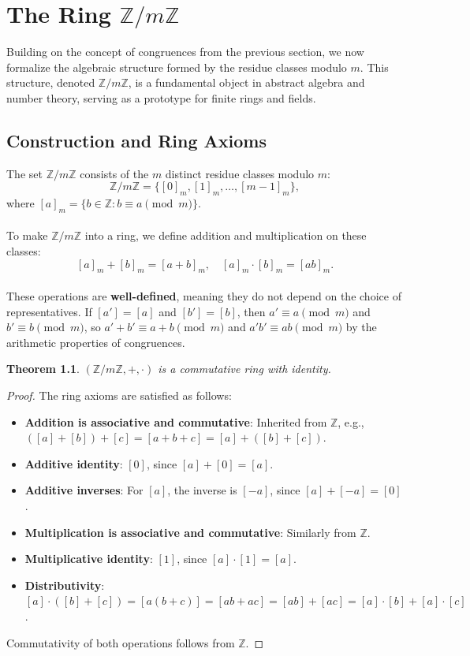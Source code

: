 \documentclass[12pt,openany]{book}
\theoremstyle{definition}
\theoremstyle{plain}
\newtheorem{theorem}{Theorem}[chapter]
\theoremstyle{remark}
\begin{document}
\chapter{The Ring $\mathbb{Z}/m\mathbb{Z}$}

Building on the concept of congruences from the previous section, we now formalize the algebraic structure formed by the residue classes modulo $m$. This structure, denoted $\mathbb{Z}/m\mathbb{Z}$, is a fundamental object in abstract algebra and number theory, serving as a prototype for finite rings and fields.

\section{Construction and Ring Axioms}

The set $\mathbb{Z}/m\mathbb{Z}$ consists of the $m$ distinct residue classes modulo $m$:
\[
\mathbb{Z}/m\mathbb{Z} = \{ [0]_m, [1]_m, \dots, [m-1]_m \},
\]
where $[a]_m = \{ b \in \mathbb{Z} : b \equiv a \pmod{m} \}$.
\noindent
\\ \\
To make $\mathbb{Z}/m\mathbb{Z}$ into a ring, we define addition and multiplication on these classes:
\[
[a]_m + [b]_m = [a + b]_m, \quad [a]_m \cdot [b]_m = [a b]_m.
\]
\noindent
\\
These operations are \textbf{well-defined}, meaning they do not depend on the choice of representatives. If $[a'] = [a]$ and $[b'] = [b]$, then $a' \equiv a \pmod{m}$ and $b' \equiv b \pmod{m}$, so $a' + b' \equiv a + b \pmod{m}$ and $a' b' \equiv a b \pmod{m}$ by the arithmetic properties of congruences.

\begin{theorem}
  $(\mathbb{Z}/m\mathbb{Z}, +, \cdot)$ is a commutative ring with identity.
\end{theorem}

\begin{proof}
  The ring axioms are satisfied as follows:
  \begin{itemize}
    \item \textbf{Addition is associative and commutative}: Inherited from $\mathbb{Z}$, e.g., $([a] + [b]) + [c] = [a + b + c] = [a] + ([b] + [c])$.
    \item \textbf{Additive identity}: $[0]$, since $[a] + [0] = [a]$.
    \item \textbf{Additive inverses}: For $[a]$, the inverse is $[-a]$, since $[a] + [-a] = [0]$.
    \item \textbf{Multiplication is associative and commutative}: Similarly from $\mathbb{Z}$.
    \item \textbf{Multiplicative identity}: $[1]$, since $[a] \cdot [1] = [a]$.
    \item \textbf{Distributivity}: $[a] \cdot ([b] + [c]) = [a(b + c)] = [a b + a c] = [a b] + [a c] = [a] \cdot [b] + [a] \cdot [c]$.
  \end{itemize}
  Commutativity of both operations follows from $\mathbb{Z}$.
\end{proof}
\end{document}

